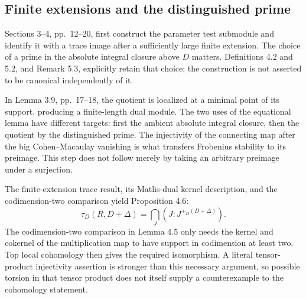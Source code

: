 \documentclass[10pt]{article}
\begin{document}
\subsection*{Finite extensions and the distinguished prime}
Sections 3–4, pp. 12–20, first construct the parameter test submodule and identify it with a trace image after a sufficiently large finite extension. The choice of a prime in the absolute integral closure above \(D\) matters. Definitions 4.2 and 5.2, and Remark 5.3, explicitly retain that choice; the construction is not asserted to be canonical independently of it.\par
In Lemma 3.9, pp. 17–18, the quotient is localized at a minimal point of its support, producing a finite-length dual module. The two uses of the equational lemma have different targets: first the ambient absolute integral closure, then the quotient by the distinguished prime. The injectivity of the connecting map after the big Cohen–Macaulay vanishing is what transfers Frobenius stability to its preimage. This step does not follow merely by taking an arbitrary preimage under a surjection.\par
The finite-extension trace result, its Matlis-dual kernel description, and the codimension-two comparison yield Proposition 4.6: \[\tau_D(R,D+\Delta)=\bigcap_J (J:J^{+_D(D+\Delta)}).\] The codimension-two comparison in Lemma 4.5 only needs the kernel and cokernel of the multiplication map to have support in codimension at least two. Top local cohomology then gives the required isomorphism. A literal tensor-product injectivity assertion is stronger than this necessary argument, so possible torsion in that tensor product does not itself supply a counterexample to the cohomology statement.\par
\end{document}
